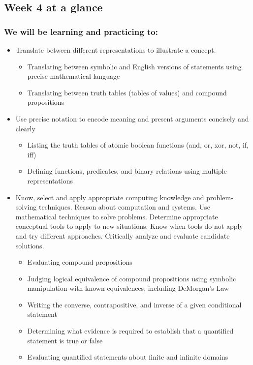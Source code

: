 \documentclass[12pt, oneside]{article}
\begin{document}
\begin{flushright}
\end{flushright} 
\subsection*{Week 4 at a glance}

\subsubsection*{We will be learning and practicing to:}
\begin{itemize}

\item Translate between different representations to illustrate a concept.
\begin{itemize}
   \item Translating between symbolic and English versions of statements using precise mathematical language
   \item Translating between truth tables (tables of values) and compound propositions
\end{itemize}

\item Use precise notation to encode meaning and present arguments concisely and clearly
\begin{itemize}
    \item Listing the truth tables of atomic boolean functions (and, or, xor, not, if, iff)
    \item Defining functions, predicates, and binary relations using multiple representations
\end{itemize}

\item Know, select and apply appropriate computing knowledge and problem-solving techniques. Reason about computation and systems. Use mathematical techniques to solve problems. Determine appropriate conceptual tools to apply to new situations. Know when tools do not apply and try different approaches. Critically analyze and evaluate candidate solutions.
\begin{itemize}
    \item Evaluating compound propositions
    \item Judging logical equivalence of compound propositions using symbolic manipulation with known equivalences, including DeMorgan's Law
    \item Writing the converse, contrapositive, and inverse of a given conditional statement
    \item Determining what evidence is required to establish that a quantified statement is true or false
    \item Evaluating quantified statements about finite and infinite domains
\end{itemize}

\end{itemize}
\end{document}
